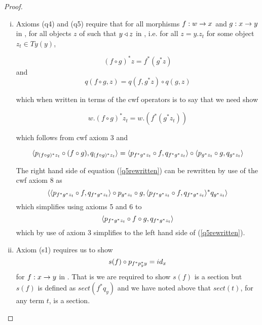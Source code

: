 \begin{proof}
\begin{enumerate}[(i)]
(\ref{q3rewritten})  simplifies to
\begin{equation}
\tuple{p_{y_t},q_{y_t}}=id_{x.y_t}
\end{equation}
and this follows by cwf axiom 7.  
\item
Axioms (q4) and (q5) require that 
for all morphisms $f:w \rightarrow x$ and $g:x \rightarrow y$ in \catcw, for all objects $z$ of \catcw such that $y \triangleleft z$ in , i.e. for all $z=y.z_t$ for some object
$z_t \in Ty(y)$,

\begin{equation}
(f \circ g)^*z =  f^* (g ^* z)
\end{equation} 
and
\begin{equation}
q(f \circ g,z) = q(f,g^*z) \circ q(g,z)
\end{equation}

which when written in terms of the cwf operators is to say that we need show

\begin{equation}
w.(f \circ g)^*z_t =  w.(f^* (g ^* z_t))  \label{q4rewritten}
\end{equation}

which follows from cwf axiom 3 and 

\begin{equation}
\langle p_{(f \circ g)^*z_t} \circ (f \circ g),q_{(f \circ g)^*z_t}\rangle =  \langle p_{f^*g^*z_t} \circ f,q_{f^*g^*z_t}\rangle \circ \langle p_{g^*z_t} \circ g,q_{g^*z_t}\rangle \label{q5rewritten}
\end{equation}


The right hand side of equation (\ref{q5rewritten}) can be rewritten by use of the cwf axiom 8 as
\begin{equation*}
\langle
    \langle p_{f^*g^*z_t} \circ f,q_{f^*g^*z_t}\rangle \circ p_{g^*z_t} \circ g,
		\langle p_{f^*g^*z_t} \circ f,q_{f^*g^*z_t}\rangle ^* q_{g^*z_t}
\rangle
\end{equation*} 
which simplifies using axioms 5 and 6 to 
\begin{equation*}
\langle
    p_{f^*g^*z_t} \circ f  \circ g,
		q_{f^*g^*z_t}
\rangle
\end{equation*}
which by use of axiom 3 simplifies to the left hand side of (\ref{q5rewritten}).
\item
Axiom (s1) requires us to show
\begin{equation}
s(f) \circ p_{f^* p_y ^* y}=id_x
\end{equation}
for $f: x \rightarrow y$ in \catc. 
That is we are required to show $s(f)$ is a section but $s(f)$ is defined as $sect(f ^*q_y)$ 
and we have noted above that $sect(t)$, for any term $t$, is a section. 


\end{enumerate}
\end{proof}
